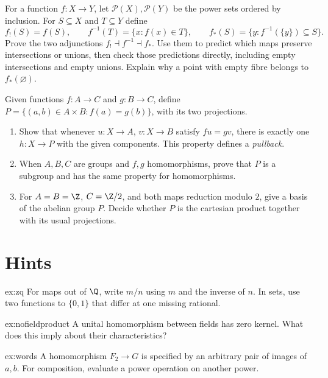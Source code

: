 \begin{exercise}[$\star\star$]\label{ex:v10new-ch01-subsets}
For a function $f:X\to Y$, let $\mathcal P(X),\mathcal P(Y)$ be the power sets ordered by inclusion. For $S\subseteq X$ and $T\subseteq Y$ define
\[
f_!(S)=f(S),\qquad f^{-1}(T)=\{x:f(x)\in T\},\qquad
f_*(S)=\{y:f^{-1}(\{y\})\subseteq S\}.
\]
Prove the two adjunctions $f_!\dashv f^{-1}\dashv f_*$. Use them to predict which maps preserve intersections or unions, then check those predictions directly, including empty intersections and empty unions. Explain why a point with empty fibre belongs to $f_*(\varnothing)$.
\end{exercise}

\begin{exercise}[$\star\star$]\label{ex:v10new-ch01-pullback}
Given functions $f:A\to C$ and $g:B\to C$, define
$P=\{(a,b)\in A\times B:f(a)=g(b)\}$, with its two projections.
\begin{enumerate}[label=(\alph*)]
\item Show that whenever $u:X\to A$, $v:X\to B$ satisfy $fu=gv$, there is exactly one $h:X\to P$ with the given components. This property defines a \emph{pullback}.
\item When $A,B,C$ are groups and $f,g$ homomorphisms, prove that $P$ is a subgroup and has the same property for homomorphisms.
\item For $A=B=\Z$, $C=\Z/2$, and both maps reduction modulo $2$, give a basis of the abelian group $P$. Decide whether $P$ is the cartesian product together with its usual projections.
\end{enumerate}
\end{exercise}

\section{Hints}

\begin{hint}{ex:zq}
For maps out of $\Q$, write $m/n$ using $m$ and the inverse of $n$. In sets, use two functions to $\{0,1\}$ that differ at one missing rational.
\end{hint}

\begin{hint}{ex:nofieldproduct}
A unital homomorphism between fields has zero kernel. What does this imply about their characteristics?
\end{hint}

\begin{hint}{ex:words}
A homomorphism $F_2\to G$ is specified by an arbitrary pair of images of $a,b$. For composition, evaluate a power operation on another power.
\end{hint}

